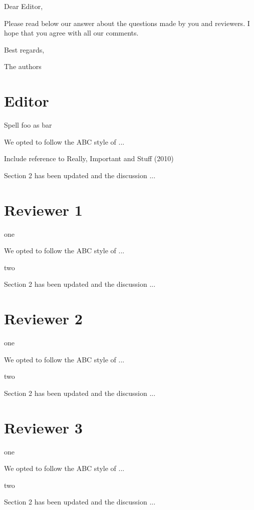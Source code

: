 \documentclass[answers,12pt]{exam}
\begin{document}
Dear Editor, \bigskip

Please read below our answer about the
questions made by you and reviewers. I hope that you agree
with all our comments. \bigskip

Best regards,\bigskip

The authors

\pagebreak

\section{Editor}

\begin{questions}
\question Spell foo as bar
\begin{solution}
 We opted to follow the ABC style of ...
\end{solution}
\question  Include reference to Really, Important and Stuff (2010)
\begin{solution}
Section 2 has been updated and the discussion ...
\end{solution}
\end{questions}

\section{Reviewer 1}

\begin{questions}
\question one
\begin{solution}
 We opted to follow the ABC style of ...
\end{solution}
\question  two
\begin{solution}
Section 2 has been updated and the discussion ...
\end{solution}
\end{questions}

\section{Reviewer 2}

\begin{questions}
\question one
\begin{solution}
 We opted to follow the ABC style of ...
\end{solution}
\question  two
\begin{solution}
Section 2 has been updated and the discussion ...
\end{solution}
\end{questions}


\section{Reviewer 3}

\begin{questions}
\question one
\begin{solution}
 We opted to follow the ABC style of ...
\end{solution}
\question  two
\begin{solution}
Section 2 has been updated and the discussion ...
\end{solution}
\end{questions}
\end{document}
